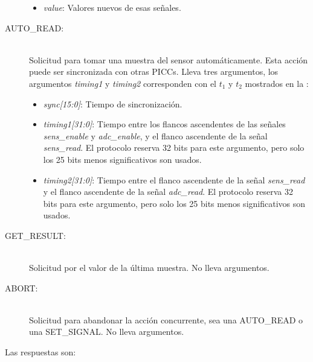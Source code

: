 \documentclass[a4paper, twoside, 11pt]{report}
\begin{document}
\begin{description}
\begin{itemize}
    \item \textit{value}: Valores nuevos de esas señales.
  \end{itemize}
  \item[AUTO\_READ:] \hfill \\ Solicitud para tomar una muestra del sensor automáticamente. Esta acción puede ser sincronizada con otras PICCs. Lleva tres argumentos, los argumentos \textit{timing1} y \textit{timing2} corresponden con el $t_1$ y $t_2$ mostrados en la :
  \begin{itemize}
    \item \textit{sync[15:0]}: Tiempo de sincronización.
    \item \textit{timing1[31:0]}: Tiempo entre los flancos ascendentes de las señales \textit{sens\_enable} y \textit{adc\_enable}, y el flanco ascendente de la señal \textit{sens\_read}. El protocolo reserva 32 bits para este argumento, pero solo los 25 bits menos significativos son usados.
    \item \textit{timing2[31:0]}: Tiempo entre el flanco ascendente de la señal \textit{sens\_read} y el flanco ascendente de la señal \textit{adc\_read}. El protocolo reserva 32 bits para este argumento, pero solo los 25 bits menos significativos son usados.
  \end{itemize}
  \item[GET\_RESULT:] \hfill \\ Solicitud por el valor de la última muestra. No lleva argumentos.
  \item[ABORT:] \hfill \\ Solicitud para abandonar la acción concurrente, sea una AUTO\_READ o una SET\_SIGNAL. No lleva argumentos.
\end{description}

Las respuestas son:
\end{document}
